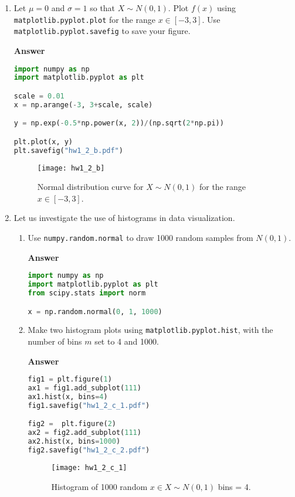 \documentclass[11pt]{article}
\begin{document}
\begin{enumerate}[label=(\alph*)]
\newpage
\item Let $\mu = 0$ and $\sigma = 1$ so that $X \sim N(0,1)$. Plot $f(x)$ using \texttt{matplotlib.pyplot.plot} for the range $x \in [-3,3]$. Use \texttt{matplotlib.pyplot.savefig} to save your figure.

\noindent\textbf{Answer}

\begin{lstlisting}[language=Python]
import numpy as np
import matplotlib.pyplot as plt

scale = 0.01
x = np.arange(-3, 3+scale, scale)

y = np.exp(-0.5*np.power(x, 2))/(np.sqrt(2*np.pi))

plt.plot(x, y)
plt.savefig("hw1_2_b.pdf")
\end{lstlisting}

\begin{figure}[h]
\centering
\texttt{[image: hw1\_2\_b]}
\caption{Normal distribution curve for $X \sim N(0,1)$ for the range $x \in [-3,3]$.}
\label{fig: figure}
\end{figure}

\newpage
\item Let us investigate the use of histograms in data visualization.
\begin{enumerate}[label=(\roman*)]
\item Use \texttt{numpy.random.normal} to draw 1000 random samples from $N(0,1)$.

\noindent\textbf{Answer}

\begin{lstlisting}[language=Python]
import numpy as np
import matplotlib.pyplot as plt
from scipy.stats import norm

x = np.random.normal(0, 1, 1000)
\end{lstlisting}

\item Make two histogram plots using \texttt{matplotlib.pyplot.hist}, with the number of bins $m$ set to 4 and 1000.

\noindent\textbf{Answer}

\begin{lstlisting}[language=Python]
fig1 = plt.figure(1)
ax1 = fig1.add_subplot(111)
ax1.hist(x, bins=4)
fig1.savefig("hw1_2_c_1.pdf")

fig2 =  plt.figure(2)
ax2 = fig2.add_subplot(111)
ax2.hist(x, bins=1000)
fig2.savefig("hw1_2_c_2.pdf")
\end{lstlisting}

\begin{figure}[H]
\centering
\texttt{[image: hw1\_2\_c\_1]}
\caption{Histogram of 1000 random $x \in X \sim N(0,1)$ bins = 4.}
\label{fig: figure}
\end{figure}


\end{enumerate}
\end{enumerate}
\end{document}
